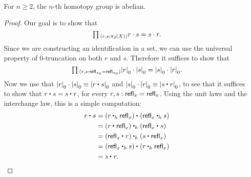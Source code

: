 \begin{thm}
For $n\geq 2$, the $n$-th homotopy group is abelian.
\end{thm}

\begin{proof}
Our goal is to show that 
\begin{equation*}
\prd{r,s:\pi_2(X)} r\cdot s=s\cdot r.
\end{equation*}
Since we are constructing an identification in a set, we can use the universal property of $0$-truncation on both $r$ and $s$. Therefore it suffices to show that
\begin{equation*}
\prd{r,s:\refl{x_0}=\refl{x_0}} \tproj{0}r\cdot \tproj{0}s=\tproj{0}s\cdot \tproj{0}r.
\end{equation*}
Now we use that $\tproj{0}{r}\cdot\tproj{0}{s}\jdeq \tproj{0}{\ct{r}{s}}$ and $\tproj{0}{s}\cdot\tproj{0}{r}\jdeq \tproj{0}{\ct{s}{r}}$, to see that it suffices to show that $\ct{r}{s}=\ct{s}{r}$, for every $r,s:\mathsf{refl}_{x}=\mathsf{refl}_{x}$. Using the unit laws and the interchange law, this is a simple computation:
\begin{align*}
\ct{r}{s} & = \ct{(\ct[h]{r}{\refl{x}})}{(\ct[h]{\refl{x}}{s})} \\
& = \ct[h]{(\ct{r}{\refl{x}})}{(\ct{\refl{x}}{s})} \\
& = \ct[h]{(\ct{\refl{x}}{r})}{(\ct{s}{\refl{x}})} \\
& = \ct{(\ct[h]{\refl{x}}{s})}{(\ct[h]{r}{\refl{x}})} \\
& = \ct{s}{r}.\qedhere
\end{align*}
\end{proof}

